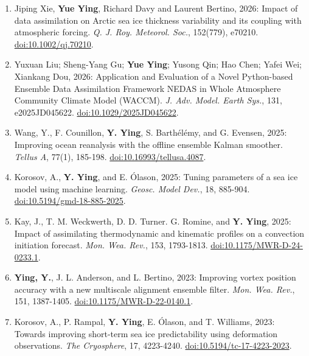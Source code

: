 \begin{enumerate}
\item Jiping Xie, \textbf{Yue Ying}, Richard Davy and Laurent Bertino, 2026: Impact of data assimilation on Arctic sea ice thickness variability and its coupling with atmospheric forcing. 
\textit{Q. J. Roy. Meteorol. Soc.}, 152(779), e70210. 
\href{https://doi.org/10.1002/qj.70210}{doi:10.1002/qj.70210}.

\item Yuxuan Liu; Sheng-Yang Gu; \textbf{Yue Ying}; Yusong Qin; Hao Chen; Yafei Wei; Xiankang Dou, 2026: Application and Evaluation of a Novel Python-based Ensemble Data Assimilation Framework NEDAS in Whole Atmosphere Community Climate Model (WACCM). 
\textit{J. Adv. Model. Earth Sys.}, 131, e2025JD045622. 
\href{https://doi.org/10.1029/2025JD045622}{doi:10.1029/2025JD045622}.

\item Wang, Y., F. Counillon, \textbf{Y. Ying}, S. Barthélémy, and G. Evensen, 2025: Improving ocean reanalysis with the offline ensemble Kalman smoother. 
\textit{Tellus A}, 77(1), 185-198. 
\href{https://doi.org/10.16993/tellusa.4087}{doi:10.16993/tellusa.4087}.

\item Korosov, A., \textbf{Y. Ying}, and E. Ólason, 2025: Tuning parameters of a sea ice model using machine learning. 
\textit{Geosc. Model Dev.}, 18, 885-904. 
\href{https://doi.org/10.5194/gmd-18-885-2025}{doi:10.5194/gmd-18-885-2025}.

\item Kay, J., T. M. Weckwerth, D. D. Turner. G. Romine, and \textbf{Y. Ying}, 2025: Impact of assimilating thermodynamic and kinematic profiles on a convection initiation forecast. 
\textit{Mon. Wea. Rev.}, 153, 1793-1813. 
\href{https://doi.org/10.1175/MWR-D-24-0233.1}{doi:10.1175/MWR-D-24-0233.1}.

\item \textbf{Ying, Y.}, J. L. Anderson, and L. Bertino, 2023: Improving vortex position accuracy with a new multiscale alignment ensemble filter. 
\textit{Mon. Wea. Rev.}, 151, 1387-1405. 
\href{https://doi.org/10.1175/MWR-D-22-0140.1}{doi:10.1175/MWR-D-22-0140.1}.

\item Korosov, A., P. Rampal, \textbf{Y. Ying}, E. Ólason, and T. Williams, 2023: Towards improving short-term sea ice predictability using deformation observations. 
\textit{The Cryosphere}, 17, 4223-4240. 
\href{https://doi.org/10.5194/tc-17-4223-2023}{doi:10.5194/tc-17-4223-2023}.


\end{enumerate}
